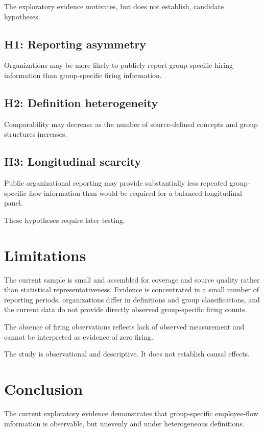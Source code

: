 \documentclass[a4paper,10pt]{article}
\begin{document}
The exploratory evidence motivates, but does not establish, candidate hypotheses.

\subsection{H1: Reporting asymmetry}

Organizations may be more likely to publicly report group-specific hiring information than group-specific firing information.

\subsection{H2: Definition heterogeneity}

Comparability may decrease as the number of source-defined concepts and group structures increases.

\subsection{H3: Longitudinal scarcity}

Public organizational reporting may provide substantially less repeated group-specific flow information than would be required for a balanced longitudinal panel.

These hypotheses require later testing.

\section{Limitations}

The current sample is small and assembled for coverage and source quality rather than statistical representativeness. Evidence is concentrated in a small number of reporting periods, organizations differ in definitions and group classifications, and the current data do not provide directly observed group-specific firing counts.

The absence of firing observations reflects lack of observed measurement and cannot be interpreted as evidence of zero firing.

The study is observational and descriptive. It does not establish causal effects.

\section{Conclusion}

The current exploratory evidence demonstrates that group-specific employee-flow information is observable, but unevenly and under heterogeneous definitions.
\end{document}
